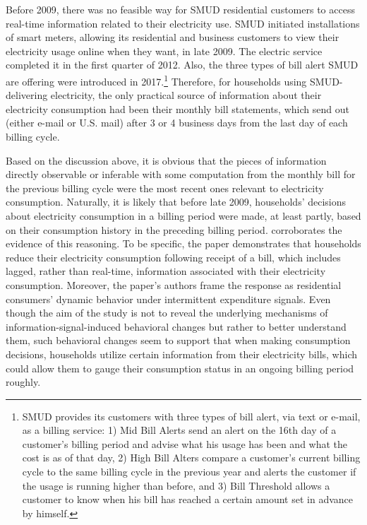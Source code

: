 Before 2009, there was no feasible way for SMUD residential customers to access real-time information related to their electricity use. SMUD initiated installations of smart meters, allowing its residential and business customers to view their electricity usage online when they want, in late 2009. The electric service completed it in the first quarter of 2012. Also, the three types of bill alert SMUD are offering were introduced in 2017.\footnote{SMUD provides its customers with three types of bill alert, via text or e-mail, as a billing service: 1) Mid Bill Alerts send an alert on the 16th day of a customer's billing period and advise what his usage has been and what the cost is as of that day, 2) High Bill Alters compare a customer's current billing cycle to the same billing cycle in the previous year and alerts the customer if the usage is running higher than before, and 3) Bill Threshold allows a customer to know when his bill has reached a certain amount set in advance by himself.} Therefore, for households using SMUD-delivering electricity, the only practical source of information about their electricity consumption had been their monthly bill statements, which send out (either e-mail or U.S. mail) after 3 or 4 business days from the last day of each billing cycle. 

Based on the discussion above, it is obvious that the pieces of information directly observable or inferable with some computation from the monthly bill for the previous billing cycle were the most recent ones relevant to electricity consumption. Naturally, it is likely that before late 2009, households' decisions about electricity consumption in a billing period were made, at least partly, based on their consumption history in the preceding billing period. \cite{Dynamic-Salience-with-Intermittent-Billing_Gilbert-and-Zivin_2014} corroborates the evidence of this reasoning. To be specific, the paper demonstrates that households reduce their electricity consumption following receipt of a bill, which includes lagged, rather than real-time, information associated with their electricity consumption. Moreover, the paper's authors frame the response as residential consumers' dynamic behavior under intermittent expenditure signals. Even though the aim of the study is not to reveal the underlying mechanisms of information-signal-induced behavioral changes but rather to better understand them, such behavioral changes seem to support that when making consumption decisions, households utilize certain information from their electricity bills, which could allow them to gauge their consumption status in an ongoing billing period roughly.